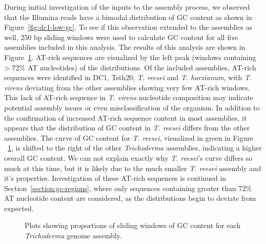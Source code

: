 During initial investigation of the inputs to the assembly process, we
observed that the Illumina reads have a bimodal distribution of GC
content as shown in Figure~\ref{fig:dc1-low-gc}. To see if this
observation extended to the assemblies as well, 250 bp sliding windows
were used to calculate GC content for all five assemblies included in this
analysis. The results of this analysis are shown in
Figure~\ref{fig:assembly-gc}. AT-rich sequences are visualized by the
left peak (windows containing > 72\% AT nucleotides) of the distributions. Of the included assemblies, AT-rich sequences were identified
in DC1, Tsth20, \textit{T. reesei} and \textit{T. harzianum}, with
\textit{T. virens} deviating from the other assemblies showing very
few AT-rich windows. This lack of AT-rich sequence in
\textit{T. virens} nucleotide composition may indicate potential
assembly issues or even misclassification of the organism. In addition
to the confirmation of increased AT-rich sequence content in most
assemblies, it appears that the distribution of GC content in
\textit{T. reesei} differs from the other assemblies. The curve of GC
content for \textit{T. reesei}, visualized in green in Figure
~\ref{fig:assembly-gc}, is shifted to the right of the other
\textit{Trichoderma} assemblies, indicating a higher overall GC content.
We can not explain
exactly why \textit{T. reesei}'s curve differs so much at this time,
but it is likely due to the much smaller \textit{T. reesei} assembly
and it's properties. Investigation of these AT-rich sequences is
continued in Section~\ref{section:gc-regions}, where only sequences
containing greater than 72\% AT nucleotide content are
considered, as the distributions begin to deviate from expected.

\begin{figure}
  \begin{center}
  \end{center}
  \caption[GC content distribution for each Trichoderma genome assembly]{Plots showing proportions of sliding windows of GC content
    for each \textit{Trichoderma} genome assembly.}\label{fig:assembly-gc}
\end{figure}


